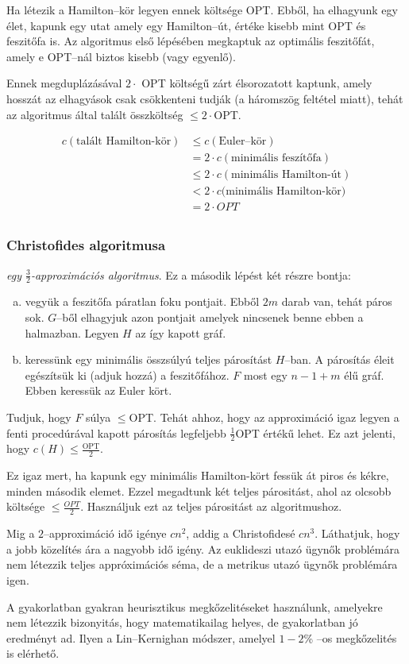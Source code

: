 Ha létezik a Hamilton--kör legyen ennek költsége OPT. Ebből, ha elhagyunk egy
élet, kapunk egy utat amely egy Hamilton--út, értéke kisebb mint OPT és
feszitőfa is. Az algoritmus első lépésében megkaptuk az optimális feszitőfát,
amely e OPT--nál biztos kisebb (vagy egyenlő).

Ennek megduplázásával $2 \cdot$ OPT költségű zárt élsorozatott kaptunk, amely
hosszát az elhagyások csak csökkenteni tudják (a háromszög feltétel miatt),
tehát az algoritmus által talált összköltség $\leq 2 \cdot$OPT.

\begin{align*}
 c(\mbox{talált Hamilton-kör}) &\leq c(\mbox{Euler--kör})		         \\ 
 						       &= 2  \cdot c(\mbox{minimális feszítőfa})       \\
 							   & \leq 2 \cdot c(\mbox{minimális Hamilton-út}) \\ 
 							   & < 2\cdot c(\mbox{minimális Hamilton-kör)}    \\ 
 							   & = 2\cdot OPT 								  \\
\end{align*}

\subsubsection{Christofides algoritmusa}

\emph{egy $\frac{3}{2}$-approximációs algoritmus}. Ez a második lépést két részre bontja:

\begin{enumerate}[(a)]
\item vegyük a feszitőfa páratlan foku pontjait. Ebből $2m$ darab van, tehát
páros sok. $G$--ből elhagyjuk azon pontjait amelyek nincsenek benne ebben a
halmazban. Legyen $H$ az így kapott gráf.
\item keressünk egy minimális összsúlyú teljes párosítást $H$--ban. A párosítás
éleit egészítsük ki (adjuk hozzá) a feszitőfához. $F$ most egy $n-1+m$ élű gráf.
Ebben keressük az Euler kört.
\end{enumerate}

Tudjuk, hogy $F$ súlya $\leq$OPT. Tehát ahhoz, hogy az approximáció igaz legyen
a fenti procedúrával kapott párosítás legfeljebb $\frac{1}{2}$OPT értékű lehet.
Ez azt jelenti, hogy $c(H) \leq \frac{\mbox{OPT}}{2}$.

Ez igaz mert, ha kapunk egy minimális Hamilton-kört fessük át piros és kékre,
minden második elemet. Ezzel megadtunk két teljes párositást, ahol az olcsobb
költsége $\leq \frac{OPT}{2}$. Használjuk ezt az teljes párositást az
algoritmushoz.

Mig a $2$--approximáció idő igénye $cn^2$, addig a Christofidesé $cn^3$.
Láthatjuk, hogy a jobb közelítés ára a nagyobb idő igény. Az euklideszi utazó 
ügynők problémára nem létezzik teljes appróximációs séma, de a metrikus utazó 
ügynők problémára igen. 

A gyakorlatban gyakran heurisztikus megkőzelitéseket használunk, amelyekre nem
létezzik bizonyitás, hogy matematikailag helyes, de gyakorlatban jó eredményt
ad. Ilyen a Lin--Kernighan módszer, amelyel $1-2$\% --os megkőzelités is
elérhető.
